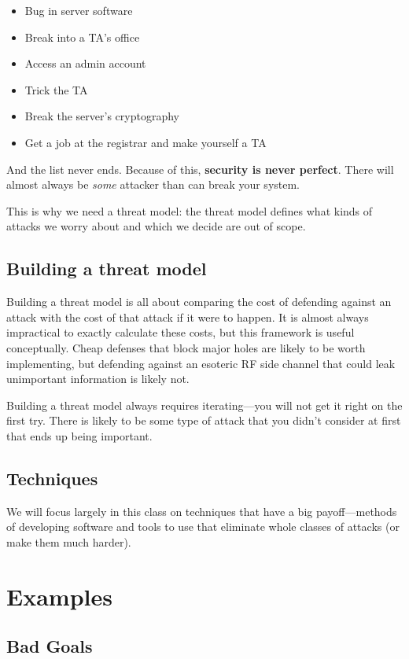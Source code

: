 \begin{itemize}
	\item Bug in server software
	\item Break into a TA's office
	\item Access an admin account
	\item Trick the TA
	\item Break the server's cryptography
	\item Get a job at the registrar and make yourself a TA
\end{itemize}

And the list never ends. Because of this, \textbf{security is never perfect}. There will almost always be \textit{some} attacker than can break your system.

This is why we need a threat model: the threat model defines what kinds of attacks we worry about and which we decide are out of scope.

\subsection{Building a threat model}
Building a threat model is all about comparing the cost of defending against an attack with the cost of that attack if it were to happen. It is almost always impractical to exactly calculate these costs, but this framework is useful conceptually. Cheap defenses that block major holes are likely to be worth implementing, but defending against an esoteric RF side channel that could leak unimportant information is likely not.

Building a threat model always requires iterating---you will not get it right on the first try. There is likely to be some type of attack that you didn't consider at first that ends up being important.

\subsection{Techniques}
We will focus largely in this class on techniques that have a big payoff---methods of developing software and tools to use that eliminate whole classes of attacks (or make them much harder). 

\section{Examples}
\subsection{Bad Goals}
